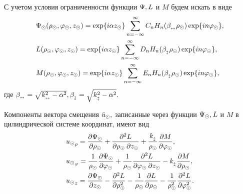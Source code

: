 С учетом условия ограниченности функции $\P, L$ и $M$ будем искать в виде
\begin{align}
&\P\cyl(\r\cyl, \f\cyl, z\cyl)= \exp\{i\alpha z\cyl\}\sum_{n=-\infty}^{\infty}C_nH_n(\beta_{\prodol} \r\cyl)\exp\{in\f\cyl\},\label{pazloj_psi}\\
&L(\r\cyl, \f\cyl, z\cyl)= \exp\{i\alpha z\cyl\}\sum_{n=-\infty}^{\infty}D_nH_n(\beta_{\popr} \r\cyl)\exp\{in\f\cyl\},\label{pazloj_l}\\
&M(\r\cyl, \f\cyl, z\cyl)= \exp\{i\alpha z\cyl\}\sum_{n=-\infty}^{\infty}E_nH_n(\beta_{\popr} \r\cyl)\exp\{in\f\cyl\},\label{pazloj_m}
\end{align}
где $\beta_{\prodol}=\sqrt{k_{\prodol}^2-\alpha^2}, \beta_{\popr}=\sqrt{k_{\popr}^2-\alpha^2}.$

Компоненты вектора смещения $\bar{u}\cyl,$ записанные через функции $\P\cyl, L$ и $M$ в цилиндрической системе координат, имеют вид
\begin{align}\label{u_cherez_L_M}
&{u\cyl}_\r=\frac{\partial \P\cyl}{\partial\r\cyl}+\frac{\partial^2 L}{\partial\r\cyl\:\partial z\cyl}+\frac{k_{\popr}}{\r\cyl}\frac{\partial M}{\partial \f\cyl},\\
&{u\cyl}_\f=\frac{1}{\r\cyl}\frac{\partial \P\cyl}{\partial \f\cyl}+\frac{1}{\r\cyl}\frac{\partial^{2} L}{\partial\f\cyl\: \partial z\cyl}-k_{\popr}\frac{\partial M}{\partial \r\cyl},\\
&{u\cyl}_z=\frac{\partial\P\cyl}{\partial z\cyl}-\frac{\partial^{2} L}{\partial \r^2\cyl}-\frac{1}{\r\cyl}\frac{\partial L}{\partial \r\cyl}-\frac{1}{\r^2\cyl}\frac{\partial^2L}{\partial\f^2\cyl}.
\end{align}

